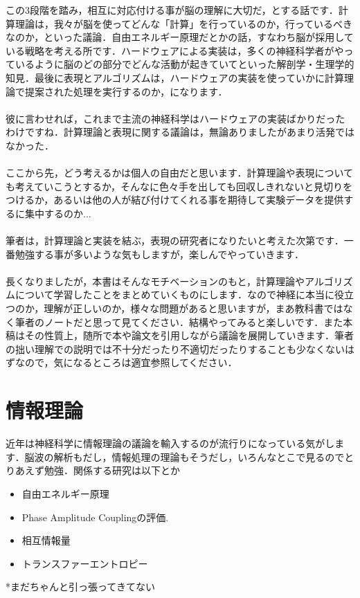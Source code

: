 \documentclass[11pt,a4paper]{jsarticle}                    %
\begin{document}
この3段階を踏み，相互に対応付ける事が脳の理解に大切だ，とする話です．計算理論は，我々が脳を使ってどんな「計算」を行っているのか，行っているべきなのか，といった議論．自由エネルギー原理だとかの話，すなわち脳が採用している戦略を考える所です．ハードウェアによる実装は，多くの神経科学者がやっているように脳のどの部分でどんな活動が起きていてといった解剖学・生理学的知見．最後に表現とアルゴリズムは，ハードウェアの実装を使っていかに計算理論で提案された処理を実行するのか，になります．\\
\\
彼に言わせれば，これまで主流の神経科学はハードウェアの実装ばかりだったわけですね．計算理論と表現に関する議論は，無論ありましたがあまり活発ではなかった．
\\
\\
ここから先，どう考えるかは個人の自由だと思います．計算理論や表現についても考えていこうとするか，そんなに色々手を出しても回収しきれないと見切りをつけるか，あるいは他の人が結び付けてくれる事を期待して実験データを提供するに集中するのか...\\
\\
筆者は，計算理論と実装を結ぶ，表現の研究者になりたいと考えた次第です．一番勉強する事が多いような気もしますが，楽しんでやっていきます．\\
\\
長くなりましたが，本書はそんなモチベーションのもと，計算理論やアルゴリズムについて学習したことをまとめていくものにします．なので神経に本当に役立つのか，理解が正しいのか，様々な問題があると思いますが，まあ教科書ではなく筆者のノートだと思って見てください．結構やってみると楽しいです．また本稿はその性質上，随所で本や論文を引用しながら議論を展開していきます．筆者の拙い理解での説明では不十分だったり不適切だったりすることも少なくないはずなので，気になるところは適宜参照してください．\\

\section{情報理論}
近年は神経科学に情報理論の議論を輸入するのが流行りになっている気がします．脳波の解析もだし，情報処理の理論もそうだし，いろんなとこで見るのでとりあえず勉強．関係する研究は以下とか\\
\begin{itemize}
 \item{自由エネルギー原理\cite{fep}}
 \item{Phase Amplitude Couplingの評価. \cite{tort}}
 \item{相互情報量}
 \item{トランスファーエントロピー}
\end{itemize}
*まだちゃんと引っ張ってきてない
\end{document}
